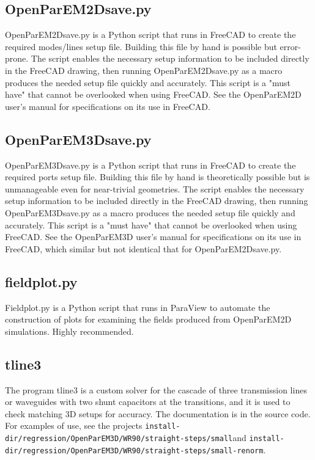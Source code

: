 \documentclass[titlepage]{article}
\renewcommand\_{\textunderscore\linebreak[1]}
\begin{document}
\subsection{OpenParEM2D\_save.py}

OpenParEM2D\_save.py is a Python script that runs in FreeCAD to create the required modes/lines setup file. Building this file by hand is possible but error-prone.  The script enables the necessary setup information to be included directly in the FreeCAD drawing, then running OpenParEM2D\_save.py as a macro produces the needed setup file quickly and accurately.  This script is a "must have" that cannot be overlooked when using FreeCAD.  See the OpenParEM2D user's manual for specifications on its use in FreeCAD.

\subsection{OpenParEM3D\_save.py}

OpenParEM3D\_save.py is a Python script that runs in FreeCAD to create the required ports setup file. Building this file by hand is theoretically possible but is unmanageable even for near-trivial geometries.  The script enables the necessary setup information to be included directly in the FreeCAD drawing, then running OpenParEM3D\_save.py as a macro produces the needed setup file quickly and accurately.  This script is a "must have" that cannot be overlooked when using FreeCAD.  See the OpenParEM3D user's manual for specifications on its use in FreeCAD, which similar but not identical that for OpenParEM2D\_save.py.

\subsection{field\_plot.py}
\label{sec:2Dplots}

Field\_plot.py is a Python script that runs in ParaView to automate the construction of plots for examining the fields produced from OpenParEM2D simulations.  Highly recommended.

\subsection{tline3}

The program tline3 is a custom solver for the cascade of three transmission lines or waveguides with two shunt capacitors at the transitions, and it is used to check matching 3D setups for accuracy.  The documentation is in the source code.  For examples of use, see the projects \newline\verb+install-dir/regression/OpenParEM3D/WR90/straight-steps/small+\newline and \newline \verb+install-dir/regression/OpenParEM3D/WR90/straight-steps/small-renorm+.
\end{document}
